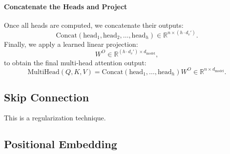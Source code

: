 \paragraph{Concatenate the Heads and Project}

   Once all heads are computed, we concatenate their outputs:
   \[
   \text{Concat}(\text{head}_1, \text{head}_2, \dots, \text{head}_h) \in \mathbb{R}^{n \times (h \cdot d_v')}.
   \]
   Finally, we apply a learned linear projection:
   \[
   W^O \in \mathbb{R}^{(h \cdot d_v') \times d_{\text{model}}},
   \]
   to obtain the final multi-head attention output:
   \[
   \text{MultiHead}(Q, K, V) = \text{Concat}(\text{head}_1, \dots, \text{head}_h) W^O \in \mathbb{R}^{n \times d_{\text{model}}}.
   \]

   
\subsection{Skip Connection}
This is a regularization technique.

\subsection{Positional Embedding}

